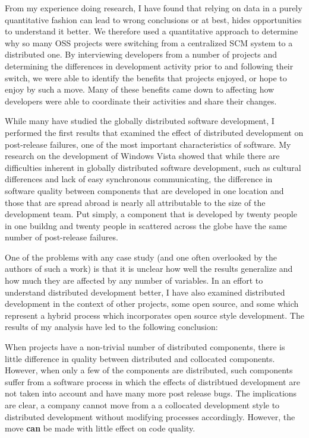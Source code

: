 \documentclass[10pt]{article}
\begin{document}
\begin{small}
From my experience doing research, I have found that relying on data in a
purely quantitative fashion can lead to wrong conclusions or at best, hides
opportunities to understand it better.  We therefore used a quantitative
approach to determine why so many OSS projects were switching from a
centralized SCM system to a distributed one.  By interviewing developers from a
number of projects and determining the differences in development activity
prior to and following their switch, we were able to identify the benefits that
projects enjoyed, or hope to enjoy by such a move.  Many of these benefits came
down to affecting how developers were able to coordinate their activities and
share their changes.

While many have studied the globally distributed software development, I
performed the first results that examined the effect of distributed development
on post-release failures, one of the most important characteristics of
software.  My research on the development of Windows Vista showed that while
there are difficulties inherent in globally distributed software development,
such as cultural differences and lack of easy synchronous communicating, the
difference in software quality between components that are developed in one
location and those that are spread abroad is nearly all attributable to the
size of the development team.  Put simply, a component that is developed by twenty
people in one buildng and twenty people in scattered across the globe have the
same number of post-release failures.

One of the problems with any case study (and one often overlooked by the
authors of such a work) is that it is unclear how well the results generalize
and how much they are affected by any number of variables.  In an effort to
understand distributed development better, I have also examined distributed
development in the context of other projects, some open source, and some which
represent a hybrid process which incorporates open source style development.
The results of my analysis have led to the following conclusion:

When projects have a non-trivial number of distributed components, there is
little difference in quality between distributed and collocated components.
However, when only a few of the components are distributed, such components
suffer from a software process in which the effects of distribtued development
are not taken into account and have many more post release bugs.  The
implications are clear, a company cannot move from a a collocated development
style to distributed development without modifying processes accordingly.
However, the move \textbf{can} be made with little effect on code quality.


\end{small}
\end{document}
